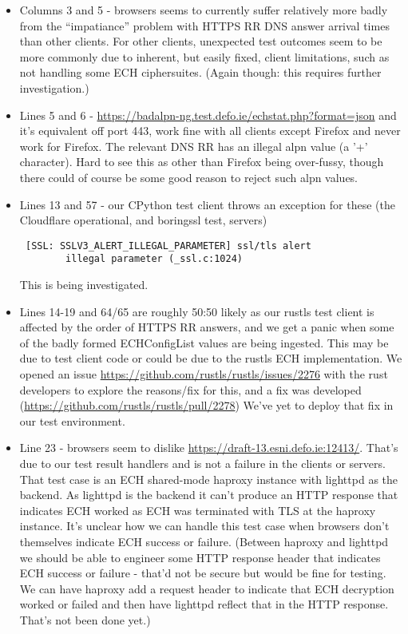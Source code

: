 \begin{itemize}

    \item Columns 3 and 5 - browsers seems to currently suffer relatively more
        badly from the ``impatiance'' problem with HTTPS RR DNS answer arrival
        times than other clients. For other clients, unexpected test outcomes
        seem to be more commonly due to inherent, but easily fixed, client
        limitations, such as not handling some ECH ciphersuites. (Again though:
        this requires further investigation.)

    \item Lines 5 and 6 -
        \url{https://badalpn-ng.test.defo.ie/echstat.php?format=json} and it's
        equivalent off port 443, work fine with all clients except Firefox and
        never work for Firefox. The relevant DNS RR has an illegal alpn value
        (a '+' character). Hard to see this as other than Firefox being
        over-fussy, though there could of course be some good reason to reject
        such alpn values.

    \item Lines 13 and 57 - our CPython test client throws an exception for
        these (the Cloudflare operational, and boringssl test, servers)
        \begin{verbatim} [SSL: SSLV3_ALERT_ILLEGAL_PARAMETER] ssl/tls alert
        illegal parameter (_ssl.c:1024) \end{verbatim} This is being
        investigated.

    \item Lines 14-19 and 64/65 are roughly 50:50 likely as our rustls test
        client is affected by the order of HTTPS RR answers, and we get a panic
        when some of the badly formed ECHConfigList values are being ingested.
        This may be due to test client code or could be due to the rustls ECH
        implementation. We opened an issue
        \url{https://github.com/rustls/rustls/issues/2276} with the rust
        developers to explore the reasons/fix for this, and a fix was developed
        (\url{https://github.com/rustls/rustls/pull/2278}) We've yet to deploy
        that fix in our test environment.

    \item Line 23 - browsers seem to dislike
        \url{https://draft-13.esni.defo.ie:12413/}.  That's due to our test
        result handlers and is not a failure in the clients or servers. That test case is
        an ECH shared-mode haproxy instance with lighttpd as the backend. As
        lighttpd is the backend it can't produce an HTTP response that
        indicates ECH worked as ECH was terminated with TLS at the haproxy
        instance. It's unclear how we can handle this test case when browsers
        don't themselves indicate ECH success or failure. (Between haproxy and
        lighttpd we should be able to engineer some HTTP response header that
        indicates ECH success or failure - that'd not be secure but would be
        fine for testing. We can have haproxy add a request header to indicate
        that ECH decryption worked or failed and then have lighttpd reflect
        that in the HTTP response. That's not been done yet.)


\end{itemize}
